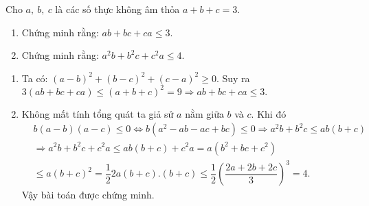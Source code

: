 \begin{ex}%
Cho $a,\ b,\ c$  là các số thực không âm thỏa $a+b+c=3$.
\begin{enumerate}
   \item Chứng minh rằng: $ab+bc+ca\leq 3$.
   \item Chứng minh rằng: $a^2b+b^2c+c^2a\leq 4$.
\end{enumerate}
    
\loigiai
    { \begin{enumerate}
    \item  Ta có: $\left( a-b \right)^2+\left( b-c \right)^2+\left( c-a \right)^2\ge 0$.
Suy ra $3\left( ab+bc+ca \right)\le  \left( a+b+c \right)^2=9\Rightarrow ab+bc+ca\le 3.$ 
\item  Không mất tính tổng quát ta giả sử $a$ nằm giữa $b$ và $c$. Khi đó
$$\begin{aligned} & b\left( a-b \right)\left( a-c \right)\le 0\Leftrightarrow b\left( a^2-ab-ac+bc \right)\le 0 \Rightarrow a^2b+b^2c\le ab\left( b+c \right)\\& \Rightarrow a^2b+b^2c+c^2a\le ab\left( b+c \right)+c^2a =a\left( b^2+bc+c^2 \right)\\& \le a \left( b+c \right)^2=\dfrac{1}{2}2a\left( b+c \right).\left( b+c \right) \le \dfrac{1}{2}\left( \dfrac{2a+2b+2c}{3} \right)^3=4. \end{aligned} $$
Vậy bài toán được chứng minh. 
    \end{enumerate}
    
        }
\end{ex}

